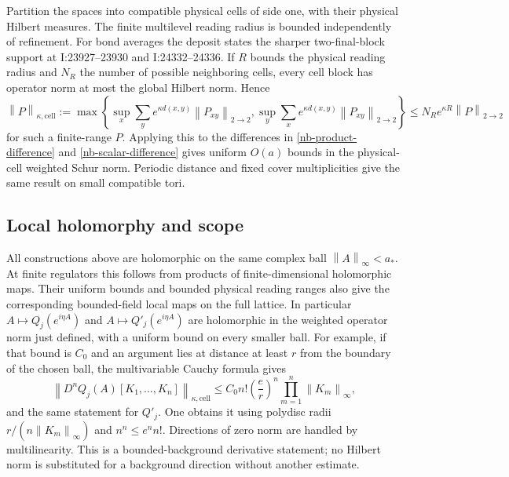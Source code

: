 \documentclass[11pt]{article}
\theoremstyle{remark}
\newcommand{\norm}[1]{\left\|#1\right\|}
\begin{document}
Partition the spaces into compatible physical cells of side
one, with their physical Hilbert measures. The finite
multilevel reading radius is bounded independently of
refinement. For bond averages the deposit states the sharper
two-final-block support at I:23927--23930 and I:24332--24336.
If $R$ bounds the physical reading radius and $N_R$ the
number of possible neighboring cells, every cell block has
operator norm at most the global Hilbert norm. Hence
\begin{equation}\label{nb-cell-Schur}
 \norm{P}_{\kappa,\mathrm{cell}}
 :=\max\left\{
 \sup_x\sum_y e^{\kappa d(x,y)}\norm{P_{xy}}_{2\to2},
 \sup_y\sum_x e^{\kappa d(x,y)}\norm{P_{xy}}_{2\to2}\right\}
 \le N_Re^{\kappa R}\norm{P}_{2\to2}
\end{equation}
for such a finite-range $P$. Applying this to the differences
in \eqref{nb-product-difference} and
\eqref{nb-scalar-difference} gives uniform $O(a)$ bounds in
the physical-cell weighted Schur norm. Periodic distance and
fixed cover multiplicities give the same result on small
compatible tori.

\subsection{Local holomorphy and scope}

All constructions above are holomorphic on the same complex
ball $\norm{A}_\infty<a_*$. At finite regulators this follows
from products of finite-dimensional holomorphic maps. Their
uniform bounds and bounded physical reading ranges also give
the corresponding bounded-field local maps on the full
lattice. In particular $A\mapsto Q_j(e^{i\eta A})$ and
$A\mapsto Q'_j(e^{i\eta A})$ are holomorphic in the weighted
operator norm just defined, with a uniform bound on every
smaller ball. For example, if that bound is $C_0$ and an
argument lies at distance at least $r$ from the boundary of
the chosen ball, the multivariable Cauchy formula gives
\begin{equation}\label{nb-Cauchy}
 \norm{D^nQ_j(A)[K_1,\ldots,K_n]}_{\kappa,\mathrm{cell}}
 \le C_0 n!\left(\frac er\right)^n
                         \prod_{m=1}^n\norm{K_m}_\infty,
\end{equation}
and the same statement for $Q'_j$. One obtains it using
polydisc radii $r/(n\norm{K_m}_\infty)$ and
$n^n\le e^n n!$. Directions of zero norm are handled by
multilinearity. This is a bounded-background derivative
statement; no Hilbert norm is substituted for a background
direction without another estimate.
\end{document}
